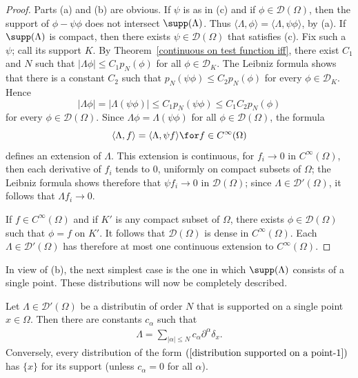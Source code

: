 \begin{proof}
Parts (a) and (b) are obvious. If $\psi$ is as in (c) and if $\phi\in\mathscr{D}(\Omega)$, then the support of $\phi-\psi\phi$ does not intersect $\supp(\Lambda)$. Thus $\langle\Lambda,\phi\rangle=\langle\Lambda,\psi\phi\rangle$, by (a). If $\supp(\Lambda)$ is compact, then there exists $\psi\in\mathscr{D}(\Omega)$ that satisfies (c). Fix such a $\psi$; call its support $K$. By Theorem~\ref{continuous on test function iff}, there exist $C_1$ and $N$ such that $|\Lambda\phi|\leq C_1p_N(\phi)$ for all $\phi\in\mathscr{D}_K$. The Leibniz formula shows that there is a constant $C_2$ such that $p_N(\psi\phi)\leq C_2p_N(\phi)$ for every $\phi\in\mathscr{D}_K$. Hence
\[|\Lambda\phi|=|\Lambda(\psi\phi)|\leq C_1p_N(\psi\phi)\leq C_1C_2p_N(\phi)\]
for every $\phi\in\mathscr{D}(\Omega)$. Since $\Lambda\phi=\Lambda(\psi\phi)$ for all $\phi\in\mathscr{D}(\Omega)$, the formula
\[\langle\Lambda,f\rangle=\langle\Lambda,\psi f\rangle\for f\in C^\infty(\Omega)\]
defines an extension of $\Lambda$. This extension is continuous, for $f_i\to 0$ in $C^\infty(\Omega)$, then each derivative of $f_i$ tends to $0$, uniformly on compact subsets of $\Omega$; the Leibniz formula shows therefore that $\psi f_i\to 0$ in $\mathscr{D}(\Omega)$; since $\Lambda\in\mathscr{D}'(\Omega)$, it follows that $\Lambda f_i\to 0$.\par
If $f\in C^\infty(\Omega)$ and if $K'$ is any compact subset of $\Omega$, there exists $\phi\in\mathscr{D}(\Omega)$ such that $\phi=f$ on $K'$. It follows that $\mathscr{D}(\Omega)$ is dense in $C^\infty(\Omega)$. Each $\Lambda\in\mathscr{D}'(\Omega)$ has therefore at most one continuous extension to $C^\infty(\Omega)$.
\end{proof}
In view of (b), the next simplest case is the one in which $\supp(\Lambda)$ consists of a single point. These distributions will now be completely described.
\begin{proposition}\label{distribution supported on a point}
Let $\Lambda\in\mathscr{D}'(\Omega)$ be a distributin of order $N$ that is supported on a single point $x\in\Omega$. Then there are constants $c_\alpha$ such that
\begin{align}\label{distribution supported on a point-1}
\Lambda=\sum_{|\alpha|\leq N}c_\alpha\partial^\alpha\delta_x.
\end{align}
Conversely, every distribution of the form $(\ref{distribution supported on a point-1})$ has $\{x\}$ for its support (unless $c_\alpha=0$ for all $\alpha$).
\end{proposition}
